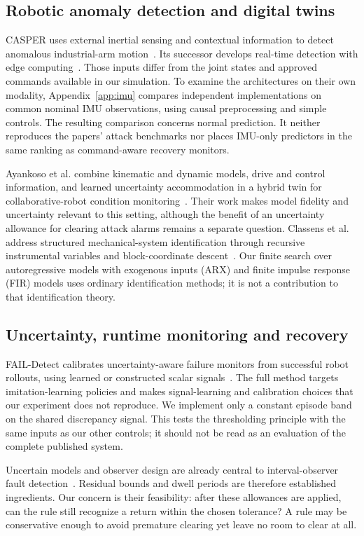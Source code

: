\documentclass[11pt]{article}
\begin{document}
\subsection{Robotic anomaly detection and digital twins}
CASPER uses external inertial sensing and contextual information to detect anomalous industrial-arm motion~\cite{casper}. Its successor develops real-time detection with edge computing~\cite{edge}. Those inputs differ from the joint states and approved commands available in our simulation. To examine the architectures on their own modality, Appendix~\ref{app:imu} compares independent implementations on common nominal IMU observations, using causal preprocessing and simple controls. The resulting comparison concerns normal prediction. It neither reproduces the papers' attack benchmarks nor places IMU-only predictors in the same ranking as command-aware recovery monitors.

Ayankoso et al. combine kinematic and dynamic models, drive and control information, and learned uncertainty accommodation in a hybrid twin for collaborative-robot condition monitoring~\cite{hybrid}. Their work makes model fidelity and uncertainty relevant to this setting, although the benefit of an uncertainty allowance for clearing attack alarms remains a separate question. Classens et al. address structured mechanical-system identification through recursive instrumental variables and block-coordinate descent~\cite{identification}. Our finite search over autoregressive models with exogenous inputs (ARX) and finite impulse response (FIR) models uses ordinary identification methods; it is not a contribution to that identification theory.

\subsection{Uncertainty, runtime monitoring and recovery}
FAIL-Detect calibrates uncertainty-aware failure monitors from successful robot rollouts, using learned or constructed scalar signals~\cite{fail}. The full method targets imitation-learning policies and makes signal-learning and calibration choices that our experiment does not reproduce. We implement only a constant episode band on the shared discrepancy signal. This tests the thresholding principle with the same inputs as our other controls; it should not be read as an evaluation of the complete published system.

Uncertain models and observer design are already central to interval-observer fault detection~\cite{interval}. Residual bounds and dwell periods are therefore established ingredients. Our concern is their feasibility: after these allowances are applied, can the rule still recognize a return within the chosen tolerance? A rule may be conservative enough to avoid premature clearing yet leave no room to clear at all.
\end{document}
